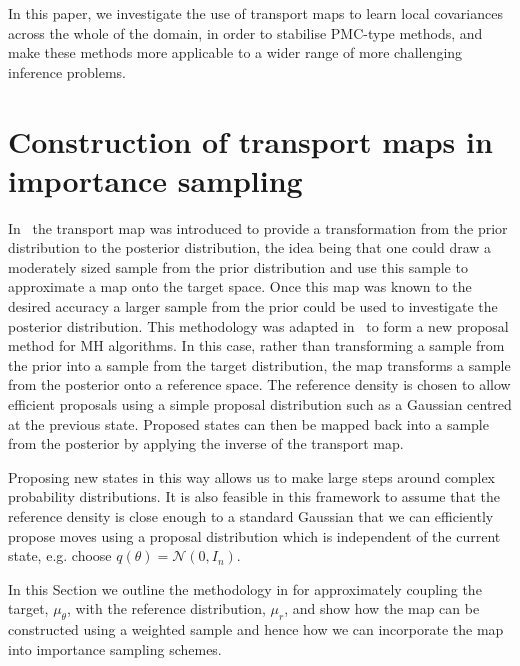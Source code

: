 \documentclass[final]{siamltex}
\begin{document}
In this paper, we investigate the use of transport maps to learn local
covariances across the whole of the domain, in order to stabilise
PMC-type methods, and make these methods more applicable to a wider
range of more challenging inference problems.

\section{Construction of transport maps in importance sampling} \label{sec:map}

In~\cite{el2012bayesian} the transport map was introduced to provide a transformation from the prior
distribution to the posterior distribution, the idea being that one could draw a moderately sized
sample from the prior distribution and use this sample to approximate a map onto the target space.
Once this map was known to the desired accuracy a larger sample from the prior could be used to
investigate the posterior distribution. This
methodology was adapted in~\cite{parno2014transport} to form a new proposal method for MH
algorithms. In this case, rather than transforming a sample from the prior into a sample from the target
distribution, the map transforms a sample from the posterior onto a reference space.
The reference density is chosen to allow efficient proposals using a simple proposal
distribution such as a Gaussian centred at the previous state. Proposed states can then be mapped back into a sample from the posterior by applying the inverse of the transport map.

Proposing new states in this way allows us to make large steps around complex probability distributions.
It is also feasible in this framework to assume that the reference density is close enough to a standard Gaussian that we can efficiently propose moves using a proposal distribution which is independent of the current state, e.g. choose $q(\theta) = \mathcal{N}(0,I_n)$.

In this Section we outline the methodology in
\cite{parno2014transport} for approximately coupling the target,
$\mu_{\theta}$, with the reference distribution, $\mu_r$, and
show how the map can be constructed using a weighted sample
and hence how we can incorporate the map into importance sampling schemes.
\end{document}
